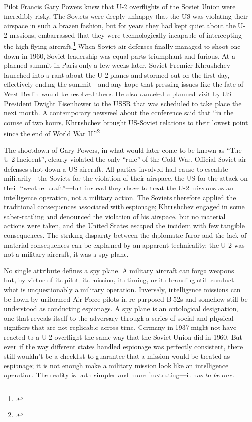 \documentclass[14pt]{extarticle}
\begin{document}
Pilot Francis Gary Powers knew that U-2 overflights of the Soviet Union were incredibly risky. The Soviets were deeply unhappy that the US was violating their airspace in such a brazen fashion, but for years they had kept quiet about the U-2 missions, embarrassed that they were technologically incapable of intercepting the high-flying aircraft.\footcite[p.~59]{powers_operation_2004} When Soviet air defenses finally managed to shoot one down in 1960, Soviet leadership was equal parts triumphant and furious. At a planned summit in Paris only a few weeks later, Soviet Premier Khrushchev launched into a rant about the U-2 planes and stormed out on the first day, effectively ending the summit---and any hope that pressing issues like the fate of West Berlin would be resolved there. He also canceled a planned visit by US President Dwight Eisenhower to the USSR that was scheduled to take place the next month. A contemporary newsreel about the conference said that \enquote{in the course of two hours, Khrushchev brought US-Soviet relations to their lowest point since the end of World War II.}\footcite{universal_studios_summit_1960}

The shootdown of Gary Powers, in what would later come to be known as \enquote{The U-2 Incident}, clearly violated the only \enquote{rule} of the Cold War. Official Soviet air defenses shot down a US aircraft. All parties involved had cause to escalate militarily---the Soviets for the violation of their airspace, the US for the attack on their \enquote{weather craft}---but instead they chose to treat the U-2 missions as an intelligence operation, not a military action. The Soviets therefore applied the traditional consequences associated with espionage; Khrushchev engaged in some saber-rattling and denounced the violation of his airspace, but no material actions were taken, and the United States escaped the incident with few tangible consequences. The striking disparity between the diplomatic furor and the lack of material consequences can be explained by an apparent technicality: the U-2 was not a military aircraft, it was a spy plane.

No single attribute defines a spy plane. A military aircraft can forgo weapons but, by virtue of its pilot, its mission, its timing, or its branding still conduct what is unquestionably a military operation. Inversely, intelligence missions can be flown by uniformed Air Force pilots in re-purposed B-52s and somehow still be understood as conducting espionage. A spy plane is an ontological designation, one that reveals itself to the adversary through a series of social and physical signifiers that are not replicable across time. Germany in 1937 might not have reacted to a U-2 overflight the same way that the Soviet Union did in 1960. But even if the way different states handled espionage was perfectly consistent, there still wouldn't be a checklist to guarantee that a mission would be treated as espionage; it is not enough make a military mission look like an intelligence operation. The reality is both simpler and more frustrating---it has \emph{to be one}.
\end{document}
